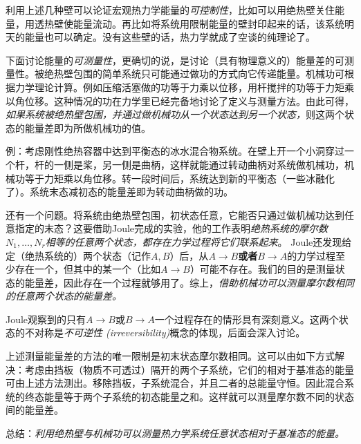 利用上述几种壁可以论证宏观热力学能量的{\it 可控制性}，比如可以用绝热壁关住能量，用透热壁使能量流动。再比如将系统用限制能量的壁封印起来的话，该系统明天的能量也可以确定。没有这些壁的话，热力学就成了空谈的纯理论了。

下面讨论能量的{\it 可测量性}，更确切的说，是讨论（具有物理意义的）能量差的可测量性。被绝热壁包围的简单系统只可能通过做功的方式向它传递能量。机械功可根据力学理论计算。例如压缩活塞做的功等于力乘以位移，用杆搅拌的功等于力矩乘以角位移。这种情况的功在力学里已经完备地讨论了定义与测量方法。由此可得，{\it 如果系统被绝热壁包围，并通过做机械功从一个状态达到另一个状态，}则这两个状态的能量差即为所做机械功的值。 

例：考虑刚性绝热容器中达到平衡态的冰水混合物系统。在壁上开一个小洞穿过一个杆，杆的一侧是桨，另一侧是曲柄，这样就能通过转动曲柄对系统做机械功，机械功等于力矩乘以角位移。转一段时间后，系统达到新的平衡态（一些冰融化了）。系统末态减初态的能量差即为转动曲柄做的功。

还有一个问题。将系统由绝热壁包围，初状态任意，它能否只通过做机械功达到任意指定的末态？这要借助Joule完成的实验，他的工作表明{\it 绝热系统的摩尔数$N_1, \dots, N_r$相等的任意两个状态，都存在力学过程将它们联系起来}。 Joule还发现给定（绝热系统的）两个状态（记作$A, B$）后，从$A \to B${\bf 或者}$B \to A$的力学过程至少存在一个，但其中的某一个（比如$A \to B$）可能不存在。我们的目的是测量状态的能量差，因此存在一个过程就够用了。综上，{\it 借助机械功可以测量摩尔数相同的任意两个状态的能量差。}

Joule观察到的只有$A \to B$或$B \to A$一个过程存在的情形具有深刻意义。这两个状态的不对称是{\it 不可逆性 (irreversibility)}概念的体现，后面会深入讨论。

上述测量能量差的方法的唯一限制是初末状态摩尔数相同。这可以由如下方式解决：考虑由挡板（物质不可透过）隔开的两个子系统，它们的相对于基准态的能量可由上述方法测出。移除挡板，子系统混合，并且二者的总能量守恒。因此混合系统的终态能量等于两个子系统的初态能量之和。这样就可以测量摩尔数不同的状态间的能量差。

总结：{\it 利用绝热壁与机械功可以测量热力学系统任意状态相对于基准态的能量。}


